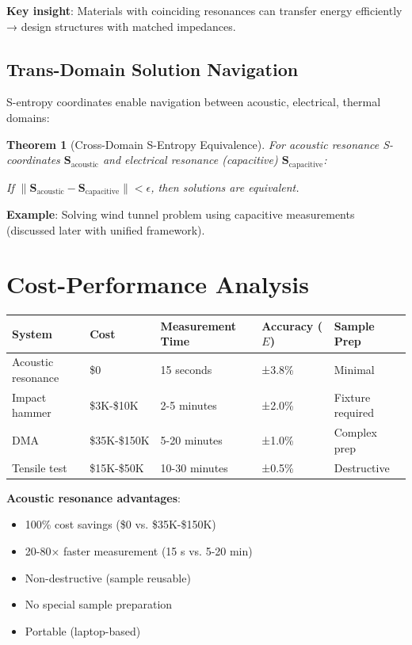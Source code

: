 \documentclass[12pt,a4paper]{article}
\newtheorem{theorem}{Theorem}
\begin{document}
\textbf{Key insight}: Materials with coinciding resonances can transfer energy efficiently → design structures with matched impedances.

\subsection{Trans-Domain Solution Navigation}

S-entropy coordinates enable navigation between acoustic, electrical, thermal domains:

\begin{theorem}[Cross-Domain S-Entropy Equivalence]
For acoustic resonance S-coordinates $\mathbf{S}_{\text{acoustic}}$ and electrical resonance (capacitive) $\mathbf{S}_{\text{capacitive}}$:

If $\|\mathbf{S}_{\text{acoustic}} - \mathbf{S}_{\text{capacitive}}\| < \epsilon$, then solutions are equivalent.
\end{theorem}

\textbf{Example}: Solving wind tunnel problem using capacitive measurements (discussed later with unified framework).

\section{Cost-Performance Analysis}

\begin{center}
\begin{tabular}{|l|l|l|l|l|}
\hline
\textbf{System} & \textbf{Cost} & \textbf{Measurement Time} & \textbf{Accuracy ($E$)} & \textbf{Sample Prep} \\
\hline
Acoustic resonance & \$0 & 15 seconds & ±3.8\% & Minimal \\
Impact hammer & \$3K-\$10K & 2-5 minutes & ±2.0\% & Fixture required \\
DMA & \$35K-\$150K & 5-20 minutes & ±1.0\% & Complex prep \\
Tensile test & \$15K-\$50K & 10-30 minutes & ±0.5\% & Destructive \\
\hline
\end{tabular}
\end{center}

\textbf{Acoustic resonance advantages}:
\begin{itemize}
\item 100\% cost savings (\$0 vs. \$35K-\$150K)
\item 20-80× faster measurement (15 s vs. 5-20 min)
\item Non-destructive (sample reusable)
\item No special sample preparation
\item Portable (laptop-based)
\end{itemize}
\end{document}
